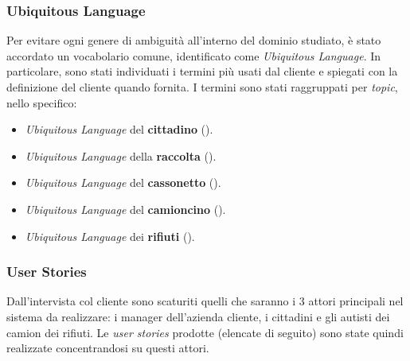 

\subsubsection{Ubiquitous Language}
Per evitare ogni genere di ambiguità all'interno del dominio studiato, è stato accordato un vocabolario comune, identificato come \textit{Ubiquitous Language}. In particolare, sono stati individuati i termini più usati dal cliente e spiegati con la definizione del cliente quando fornita. I termini sono stati raggruppati per \textit{topic}, nello specifico:
\begin{itemize}
    \item \textit{Ubiquitous Language} del \textbf{cittadino} ().
    \item \textit{Ubiquitous Language} della \textbf{raccolta} ().
    \item \textit{Ubiquitous Language} del \textbf{cassonetto} ().
    \item \textit{Ubiquitous Language} del \textbf{camioncino} ().
    \item \textit{Ubiquitous Language} dei \textbf{rifiuti} ().
\end{itemize}

\subsubsection{User Stories}
Dall'intervista col cliente sono scaturiti quelli che saranno i 3 attori principali nel sistema da realizzare: i manager dell'azienda cliente, i cittadini e gli autisti dei camion dei rifiuti. Le \textit{user stories} prodotte (elencate di seguito) sono state quindi realizzate concentrandosi su questi attori.


